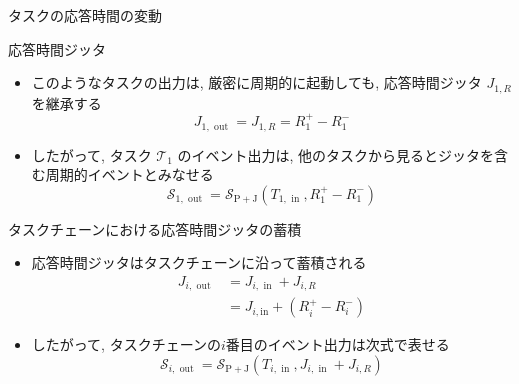 \begin{frame}{タスクの応答時間の変動}
\end{frame}

\begin{frame}{応答時間ジッタ}
    \begin{itemize}
        \item このようなタスクの出力は, 厳密に周期的に起動しても, 応答時間ジッタ $J_{1, R}$ を継承する
              \begin{equation*}
                  J_{1, \text { out }}=J_{1, R}=R_{1}^{+}-R_{1}^{-}
              \end{equation*}
        \item したがって, タスク $\mathcal{T}_{1}$ のイベント出力は, 他のタスクから見るとジッタを含む周期的イベントとみなせる
              \begin{equation*}
                  \mathcal{S}_{1, \text { out }}=\mathcal{S}_{\mathrm{P}+\mathrm{J}}\left(T_{1, \text { in }}, R_{1}^{+}-R_{1}^{-}\right)
              \end{equation*}
    \end{itemize}
\end{frame}

\begin{frame}{タスクチェーンにおける応答時間ジッタの蓄積}
    \begin{itemize}
        \item 応答時間ジッタはタスクチェーンに沿って蓄積される
              \begin{equation*}
                  \begin{aligned}
                      J_{i, \text { out }} & =J_{i, \text { in }}+J_{i, R}                        \\
                                           & =J_{i, \mathrm{in}}+\left(R_{i}^{+}-R_{i}^{-}\right)
                  \end{aligned}
              \end{equation*}

        \item したがって, タスクチェーンの$i$番目のイベント出力は次式で表せる
              \begin{equation*}
                  \mathcal{S}_{i, \text { out }}=\mathcal{S}_{\mathrm{P}+\mathrm{J}}\left(T_{i, \text { in }}, J_{i, \text { in }}+J_{i, R}\right)
              \end{equation*}
    \end{itemize}
\end{frame}


